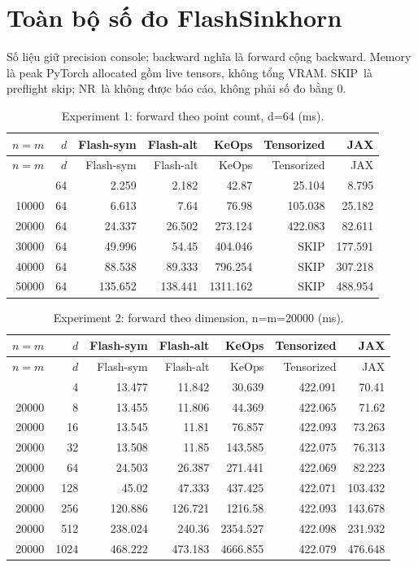 \documentclass[11pt,a4paper]{article}
\newcommand{\NR}{\textnormal{NR}}
\newcommand{\SKIP}{\textnormal{SKIP}}
\begin{document}
\section{Toàn bộ số đo FlashSinkhorn}
\label{app:fs-tables}
Số liệu giữ precision console; backward nghĩa là forward cộng backward.
Memory là peak PyTorch allocated gồm live tensors, không tổng VRAM.
\SKIP\ là preflight skip; \NR\ là không được báo cáo, không phải số đo bằng 0.
\begingroup\small
\begin{longtable}{@{}rrrrrrr@{}}
\caption{Experiment 1: forward theo point count, d=64 (ms).}\label{tab:forward-n}\\
\toprule
$n=m$ & $d$ & Flash-sym & Flash-alt & KeOps & Tensorized & JAX \\
\midrule
\endfirsthead
\toprule
$n=m$ & $d$ & Flash-sym & Flash-alt & KeOps & Tensorized & JAX \\
\midrule
\endhead
\bottomrule
\endfoot
5000 & 64 & 2.259 & 2.182 & 42.87 & 25.104 & 8.795 \\
10000 & 64 & 6.613 & 7.64 & 76.98 & 105.038 & 25.182 \\
20000 & 64 & 24.337 & 26.502 & 273.124 & 422.083 & 82.611 \\
30000 & 64 & 49.996 & 54.45 & 404.046 & \SKIP & 177.591 \\
40000 & 64 & 88.538 & 89.333 & 796.254 & \SKIP & 307.218 \\
50000 & 64 & 135.652 & 138.441 & 1311.162 & \SKIP & 488.954 \\
\end{longtable}
\endgroup

\begingroup\small
\begin{longtable}{@{}rrrrrrr@{}}
\caption{Experiment 2: forward theo dimension, n=m=20000 (ms).}\label{tab:forward-d}\\
\toprule
$n=m$ & $d$ & Flash-sym & Flash-alt & KeOps & Tensorized & JAX \\
\midrule
\endfirsthead
\toprule
$n=m$ & $d$ & Flash-sym & Flash-alt & KeOps & Tensorized & JAX \\
\midrule
\endhead
\bottomrule
\endfoot
20000 & 4 & 13.477 & 11.842 & 30.639 & 422.091 & 70.41 \\
20000 & 8 & 13.455 & 11.806 & 44.369 & 422.065 & 71.62 \\
20000 & 16 & 13.545 & 11.81 & 76.857 & 422.093 & 73.263 \\
20000 & 32 & 13.508 & 11.85 & 143.585 & 422.075 & 76.313 \\
20000 & 64 & 24.503 & 26.387 & 271.441 & 422.069 & 82.223 \\
20000 & 128 & 45.02 & 47.333 & 437.425 & 422.071 & 103.432 \\
20000 & 256 & 120.886 & 126.721 & 1216.58 & 422.093 & 143.678 \\
20000 & 512 & 238.024 & 240.36 & 2354.527 & 422.098 & 231.932 \\
20000 & 1024 & 468.222 & 473.183 & 4666.855 & 422.079 & 476.648 \\
\end{longtable}
\endgroup
\end{document}
